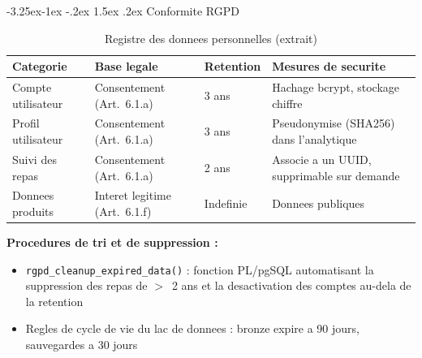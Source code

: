 \documentclass[a4paper,11pt,oneside,openany]{report}
\makeatletter
\renewcommand\subsubsection{\@startsection{subsubsection}{3}{\z@}%
  {-3.25ex\@plus -1ex \@minus -.2ex}%
  {1.5ex \@plus .2ex}%
  {\normalfont\normalsize\bfseries\color{ntblue}}}
\newcommand{\rgpd}{RGPD}
\makeatother
\begin{document}
\subsubsection{Conformite \rgpd{}}

\begin{table}[H]
\centering
\caption{Registre des donnees personnelles (extrait)}
\label{tab:rgpd}
\begin{tabularx}{\textwidth}{L{2.8cm} L{2.5cm} L{2cm} L{5.5cm}}
\toprule
\textbf{Categorie} & \textbf{Base legale} & \textbf{Retention} & \textbf{Mesures de securite} \\
\midrule
Compte utilisateur & Consentement (Art.~6.1.a) & 3 ans & Hachage bcrypt, stockage chiffre \\
Profil utilisateur & Consentement (Art.~6.1.a) & 3 ans & Pseudonymise (SHA256) dans l'analytique \\
Suivi des repas & Consentement (Art.~6.1.a) & 2 ans & Associe a un UUID, supprimable sur demande \\
Donnees produits & Interet legitime (Art.~6.1.f) & Indefinie & Donnees publiques \\
\bottomrule
\end{tabularx}
\end{table}

\textbf{Procedures de tri et de suppression :}
\begin{itemize}[nosep]
  \item \texttt{rgpd\_cleanup\_expired\_data()} : fonction PL/pgSQL automatisant
        la suppression des repas de $>$~2 ans et la desactivation des comptes
        au-dela de la retention
  \item Regles de cycle de vie du lac de donnees : bronze expire a 90 jours,
        sauvegardes a 30 jours
\end{itemize}
\end{document}

